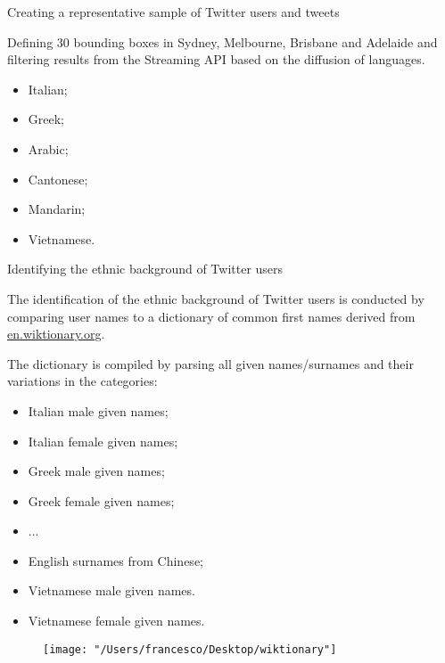 \documentclass[serif, aspectratio=169]{beamer}
\begin{document}
\begin{frame}
{Creating a representative sample of Twitter users and tweets}

Defining 30 bounding boxes in Sydney, Melbourne, Brisbane and Adelaide and filtering results from the Streaming API based on the diffusion of languages.

\begin{itemize}

\item Italian;
\item Greek;
\item Arabic;
\item Cantonese;
\item Mandarin;
\item Vietnamese.

\end{itemize}

\end{frame}

\begin{frame}
{Identifying the ethnic background of Twitter users}

{\small

The identification of the ethnic background of Twitter users is conducted by comparing user names to a dictionary of common first names derived from \url{en.wiktionary.org}.

The dictionary is compiled by parsing all given names/surnames and their variations in the categories:

}

{\tiny

\begin{itemize}

\item Italian male given names;
\item Italian female given names;
\item Greek male given names;
\item Greek female given names;
\item ... 
\item English surnames from Chinese;
\item Vietnamese male given names‎.
\item Vietnamese female given names‎.

\end{itemize}

}

\end{frame}

\begin{frame}

\begin{figure}
\texttt{[image: "/Users/francesco/Desktop/wiktionary"]}
\end{figure}

\end{frame}
\end{document}
